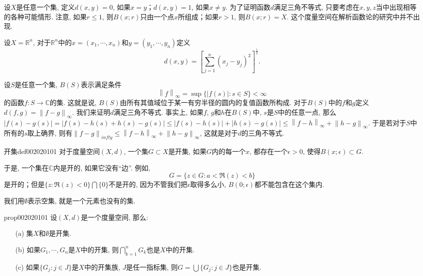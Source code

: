 \begin{example}\label{exam002020105}
设$X$是任意一个集, 定义$d(x, y) = 0$, 如果$x=y$；$d(x, y)=1$, 如果$x \neq y$. 为了证明函数$d$满足三角不等式, 只要考虑在$x,y,z$当中出现相等的各种可能情形. 注意, 如果$r \le 1$, 则$B(x; r)$只由一个点$x$所组成；如果$r > 1$, 则$B(x;r) = X$. 这个度量空间在解析函数论的研究中并不出现. 
\end{example}

\begin{example}\label{exam002020106}
设$X = \mathbb{R}^n$, 对于$\mathbb{R}^n$中的$x=(x_1,\cdots, x_n)$和$y=(y_1,\cdots,y_n)$定义
\[
d(x, y) = [\sum_{j=1}^{n}{(x_j-y_j)^2}]^{\frac{1}{2}}.
\]
\end{example}

\begin{example}\label{exam002020107}
设$S$是任意一个集, $B(S)$表示满足条件
\[
\left\|f\right\|_{\infty} = \sup{\{\left|f(s)\right|: s \in S\}} < \infty
\]
的函数$f: S \to \mathbb{C}$的集. 这就是说, $B(S)$由所有其值域位于某一有穷半径的圆内的复值函数所构成. 对于$B(S)$中的$f$和$g$定义$d(f, g) = \left\|f-g\right\|_{\infty}$. 我们来证明$d$满足三角不等式. 事实上, 如果$f$, $g$和$h$在$B(S)$中, $s$是$S$中的任意一点, 那么$|f(s)-g(s)| = |f(s)-h(s)+h(s)-g(s)| \le |f(s)-h(s)| + |h(s)-g(s)| \le \left\|f-h\right\|_{\infty} + \left\|h - g\right\|_{\infty}$. 于是若对于$S$中所有的$s$取上确界, 则有$\left\|f-g\right\|_{infty} \le \left\|f-h\right\|_{\infty} + \left\|h - g\right\|_{\infty}$, 这就是对于$d$的三角不等式. 
\end{example}

\begin{definition}{开集}{def002020101}
对于度量空间$(X, d)$, 一个集$G \subset X$是开集, 如果$G$内的每一个$x$, 都存在一个$\epsilon > 0$, 使得$B(x;\epsilon) \subset G$. 
\end{definition}

于是, 一个集在$\mathbb{C}$内是开的, 如果它没有“边”. 例如, 
\[
G = \{z \in G: a < \Re{(z)} < b\}
\]
是开的；但是$\{z: \Re{(z)} < 0\} \bigcap \{0\}$不是开的, 因为不管我们把$\epsilon$取得多么小, $B(0;\epsilon)$都不能包含在这个集内. 

我们用$\emptyset$表示空集, 就是一个元素也没有的集. 

\begin{proposition}{}{prop002020101}
设$(X, d)$是一个度量空间, 那么:
\begin{enumerate}
\item[(a)]集$X$和$\emptyset$是开集. 
\item[(b)]如果$G_1,\cdots, G_n$是$X$中的开集, 则$\bigcap_{k=1}^{n}{G_k}$也是$X$中的开集. 
\item[(c)]如果$\{G_j:j \in J\}$是$X$中的开集族, $J$是任一指标集, 则$G = \bigcup\{G_j:j \in J\}$也是开集. 
\end{enumerate}
\end{proposition}

